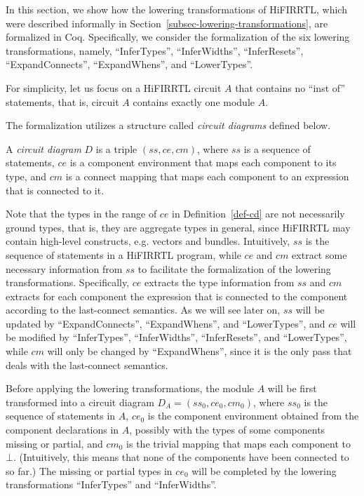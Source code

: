 
In this section, we show how the lowering transformations of HiFIRRTL, which were described informally in Section~\ref{subsec-lowering-transformations}, are formalized in Coq. Specifically, we consider the formalization of the six lowering transformations, namely, ``InferTypes'', ``InferWidths'', ``InferResets'', ``ExpandConnects'', ``ExpandWhens'', and ``LowerTypes''.

For simplicity, let us focus on a HiFIRRTL circuit $A$ that contains no ``inst of'' statements, that is, circuit $A$ contains exactly one module $A$.

The formalization utilizes a structure called \emph{circuit diagrams} defined below.   

\begin{definition}\label{def-cd}
A \emph{circuit diagram} $D$ is a triple $(ss, ce, cm)$, where $ss$ is a sequence of statements, $ce$ is a component environment that maps each component to its type, and $cm$ is a connect mapping that maps each component to an expression that is connected to it. 
\end{definition}
Note that the types in the range of $ce$ in Definition~\ref{def-cd} are not necessarily ground types, that is, they are aggregate types in general, since HiFIRRTL may contain high-level constructs, e.g. vectors and bundles. Intuitively, $ss$ is the sequence of statements in a HiFIRRTL program, while $ce$ and $cm$ extract some necessary information from $ss$ to facilitate the formalization of the lowering transformations. Specifically, $ce$ extracts the type information from $ss$ and $cm$ extracts for each component the expression that is connected to the component according to the last-connect semantics. As we will see later on, $ss$ will be updated by ``ExpandConnects'', ``ExpandWhens'', and ``LowerTypes'', and $ce$ will be modified by ``InferTypes'', ``InferWidths'', ``InferResets'',  and ``LowerTypes'',  while $cm$ will only be changed by ``ExpandWhens'', since it is the only pass that deals with the last-connect semantics. 

Before applying the lowering transformations, the module $A$ will be first transformed into a circuit diagram $D_A = (ss_0, ce_0, cm_0)$, where $ss_0$ is the sequence of statements in $A$, $ce_0$ is the component environment obtained from the component declarations in $A$, possibly with the types of some components missing or partial, and $cm_0$ is the trivial mapping that maps each component to $\bot$. (Intuitively, this means that none of the components have been connected to so far.) The missing or partial types in $ce_0$ will be completed by the lowering transformations ``InferTypes'' and ``InferWidths''.

